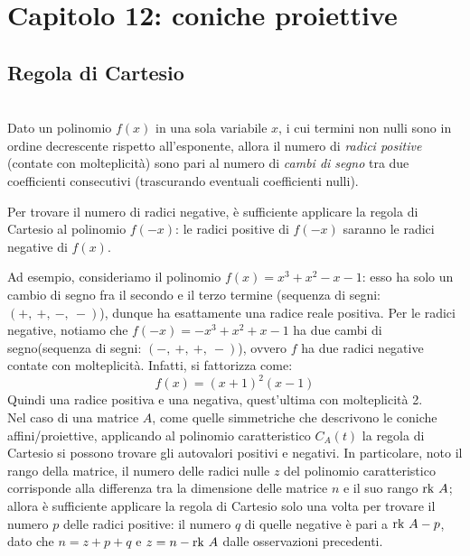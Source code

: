 \section{Capitolo 12: coniche proiettive}
\subsection{Regola di Cartesio}\label{Cartesioquellodeibidonidellacarta}
\begin{theorema}~{}\\
	Dato un polinomio $f\left(x\right)$ in una sola variabile $x$, i cui termini non nulli sono in ordine decrescente rispetto all'esponente, allora il numero di \textit{radici positive} (contate con molteplicità) sono pari al numero di \textit{cambi di segno} tra due coefficienti consecutivi (trascurando eventuali coefficienti nulli).
\end{theorema}
\begin{tips}
	Per trovare il numero di radici negative, è sufficiente applicare la regola di Cartesio al polinomio $f\left(-x\right)$: le radici positive di $f\left(-x\right)$ saranno le radici negative di $f\left(x\right)$.
\end{tips}
Ad esempio, consideriamo il polinomio $f\left(x\right)=x^3+x^2-x-1$: esso ha solo un cambio di segno fra il secondo e il terzo termine (sequenza di segni: $\left(+,\ +,\ -,\ -\right)$), dunque ha esattamente una radice reale positiva. Per le radici negative, notiamo che $f\left(-x\right)=-x^3+x^2+x-1$ ha due cambi di segno(sequenza di segni: $\left(-,\ +,\ +,\ -\right)$), ovvero $f$ ha due radici negative contate con molteplicità. Infatti, si fattorizza come:
\begin{equation*}
	f\left(x\right)=\left(x+1\right)^2\left(x-1\right)
\end{equation*}
Quindi una radice positiva e una negativa, quest'ultima con molteplicità 2.\\
Nel caso di una matrice $A$, come quelle simmetriche che descrivono le coniche affini/proiettive, applicando al polinomio caratteristico $C_A\left(t\right)$ la regola di Cartesio si possono trovare gli autovalori positivi e negativi.
In particolare, noto il rango della matrice, il numero delle radici nulle $z$ del polinomio caratteristico corrisponde alla differenza tra la dimensione delle matrice $n$ e il suo rango $\mathrm{rk}\  A$; allora è sufficiente applicare la regola di Cartesio solo una volta per trovare il numero $p$ delle radici positive: il numero $q$ di quelle negative è pari a $\mathrm{rk}\  A - p$, dato che $n=z+p+q$ e $z=n-\mathrm{rk}\  A$ dalle osservazioni precedenti.
